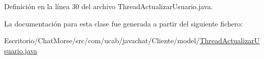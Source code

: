 Definición en la línea 30 del archivo Thread\-Actualizar\-Usuario.\-java.



La documentación para esta clase fue generada a partir del siguiente fichero\-:\begin{DoxyCompactItemize}
\item 
Escritorio/\-Chat\-Morse/src/com/ucab/javachat/\-Cliente/model/\hyperlink{_thread_actualizar_usuario_8java}{Thread\-Actualizar\-Usuario.\-java}\end{DoxyCompactItemize}
